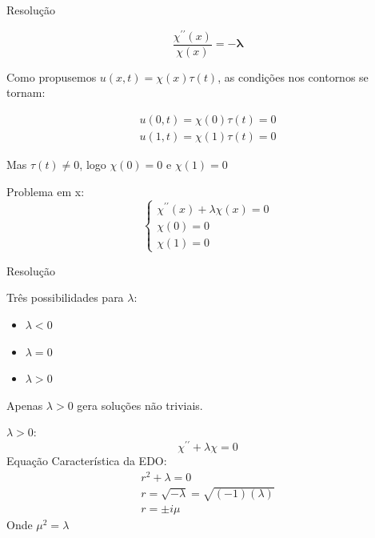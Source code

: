 \documentclass{beamer}
\begin{document}
\begin{frame}{Resolução}

\begin{equation*}
    \dfrac{\chi^{\prime\prime}(x)}{\chi(x)} = - \mathbf{\lambda}
\end{equation*}

Como propusemos $u(x,t) = \chi(x) \tau(t)$, as condições nos contornos se tornam:

\begin{equation*}
\begin{matrix}
    u(0, t) = \chi(0) \tau(t) = 0\\ 
    u(1, t) = \chi(1) \tau(t) = 0  
\end{matrix}
\end{equation*}

Mas $\tau(t) \neq 0$, logo $\chi(0) = 0$ e $\chi(1) = 0$


\begin{block}{Problema em x:}
\begin{equation}
    \left\{ \begin{matrix}
    \chi^{\prime\prime}(x) +\lambda\chi(x) = 0\\ 
    \chi(0) = 0\\ 
    \chi(1) = 0
    \end{matrix}\right.
\end{equation}
\end{block}

\end{frame}

\begin{frame}{Resolução}


Três possibilidades para $\lambda$:
\begin{itemize}
    \item $\lambda < 0$
    \item $\lambda = 0$
    \item $\lambda > 0$
\end{itemize}

Apenas $\lambda > 0$ gera soluções não triviais.
\begin{block}{$\lambda > 0$:}
\begin{equation*}
    \chi^{\prime\prime} +\lambda\chi = 0 
\end{equation*}
Equação Característica da EDO:
\begin{equation*}
    \begin{matrix}
        r^2 + \lambda = 0 \\ 
        r = \sqrt{-\lambda}  = \sqrt{(-1) (\lambda)} \\
        r = \pm i \mu
    \end{matrix}
\end{equation*}
Onde $\mu^2 = \lambda$
\end{block}
\end{frame}
\end{document}
